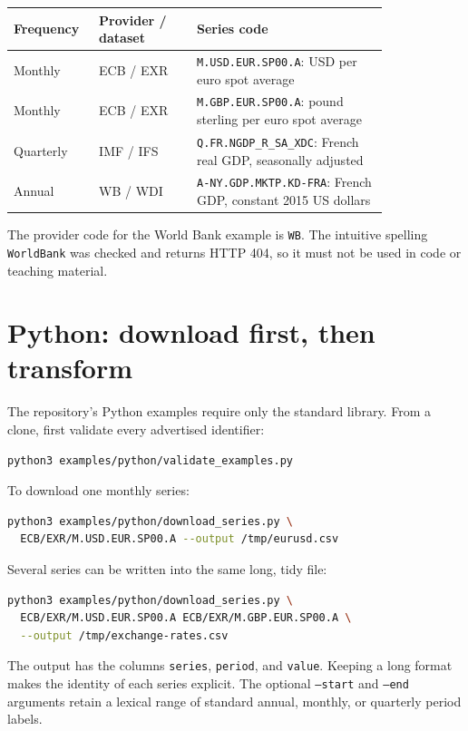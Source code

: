 \documentclass[11pt,a4paper]{article}
\begin{document}
\begin{center}
\begin{tabular}{p{0.14\linewidth}p{0.23\linewidth}p{0.45\linewidth}}
\toprule
Frequency & Provider / dataset & Series code \\
\midrule
Monthly & ECB / EXR & \texttt{M.USD.EUR.SP00.A}: USD per euro spot average \\
Monthly & ECB / EXR & \texttt{M.GBP.EUR.SP00.A}: pound sterling per euro spot average \\
Quarterly & IMF / IFS & \texttt{Q.FR.NGDP\_R\_SA\_XDC}: French real GDP, seasonally adjusted \\
Annual & WB / WDI & \texttt{A-NY.GDP.MKTP.KD-FRA}: French GDP, constant 2015 US dollars \\
\bottomrule
\end{tabular}
\end{center}

The provider code for the World Bank example is \texttt{WB}. The intuitive
spelling \texttt{WorldBank} was checked and returns HTTP 404, so it must not
be used in code or teaching material.

\section{Python: download first, then transform}

The repository's Python examples require only the standard library. From a
clone, first validate every advertised identifier:

\begin{lstlisting}[language=bash]
python3 examples/python/validate_examples.py
\end{lstlisting}

To download one monthly series:
\begin{lstlisting}[language=bash]
python3 examples/python/download_series.py \
  ECB/EXR/M.USD.EUR.SP00.A --output /tmp/eurusd.csv
\end{lstlisting}

Several series can be written into the same long, tidy file:
\begin{lstlisting}[language=bash]
python3 examples/python/download_series.py \
  ECB/EXR/M.USD.EUR.SP00.A ECB/EXR/M.GBP.EUR.SP00.A \
  --output /tmp/exchange-rates.csv
\end{lstlisting}

The output has the columns \texttt{series}, \texttt{period}, and
\texttt{value}. Keeping a long format makes the identity of each series
explicit. The optional \texttt{--start} and \texttt{--end} arguments retain a
lexical range of standard annual, monthly, or quarterly period labels.
\end{document}
